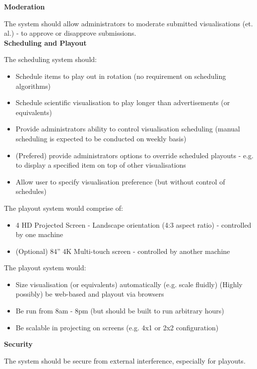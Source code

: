 \documentclass[a4paper, titlepage]{article}
\begin{document}
\textbf{\large Moderation}

The system should allow administrators to moderate submitted visualisations (et. al.) - to approve or disapprove submissions.\\

\textbf{\large Scheduling and Playout}

The scheduling system should:

\begin{itemize}
\item Schedule items to play out in rotation (no requirement on scheduling algorithms)
\item Schedule scientific visualisation to play longer than advertisements (or equivalents)
\item Provide administrators ability to control visualisation scheduling (manual scheduling is expected to be conducted on weekly basis)
\item (Prefered) provide administrators options to override scheduled playouts - e.g. to display a specified item on top of other visualisations
\item Allow user to specify visualisation preference (but without control of schedules)
\end{itemize}

The playout system would comprise of:

\begin{itemize}
\item 4 HD Projected Screen - Landscape orientation (4:3 aspect ratio) - controlled by one machine 
\item (Optional) 84” 4K Multi-touch screen - controlled by another machine
\end{itemize}

The playout system would:

\begin{itemize}
\item Size visualisation (or equivalents) automatically (e.g. scale fluidly) (Highly possibly) be web-based and playout via browsers
\item Be run from 8am - 8pm (but should be built to run arbitrary hours)
\item Be scalable in projecting on screens (e.g. 4x1 or 2x2 configuration)\\
\end{itemize}

\textbf{\large Security}

The system should be secure from external interference, especially for playouts.\\
\end{document}
